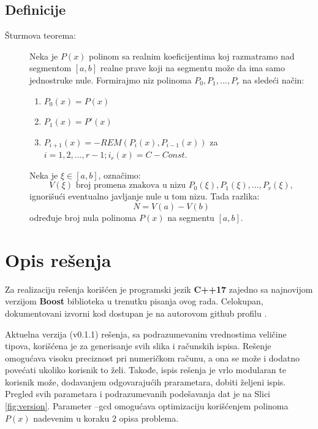 \documentclass[a4paper,10pt]{article}
\begin{document}
\subsection{Definicije}
\label{definitions}
\begin{description}
\item[Šturmova teorema:]
Neka je $P(x)$ polinom sa realnim koeficijentima koj razmatramo nad segmentom $[a,b]$ realne prave koji na segmentu može da ima samo jednostruke nule. Formirajmo niz polinoma $P_0,P_1,...,P_r$ na sledeći način:
\begin{enumerate}
    \item $P_0(x) = P(x)$
    \item $P_1(x) = P'(x)$
    \item $P_{i+1}(x) = -REM(P_i(x),P_{i-1}(x))$ za $i = 1,2,...,r-1; i_r(x) = C - Const.$
\end{enumerate}
Neka je $\xi \in [a,b]$, označimo:
\[V(\xi) \text{ broj promena znakova u nizu } P_0(\xi),P_1(\xi),...,P_r(\xi),\]
ignorišući eventualno javljanje nule u tom nizu. Tada razlika:
\[N = V(a) - V(b)\]
određuje broj nula polinoma $P(x)$ na segmentu $[a,b]$.
\end{description} 
 

\section{Opis rešenja}

Za realizaciju rešenja korišćen je programski jezik \textbf{C++17} zajedno sa najnovijom verzijom \textbf{Boost} biblioteka u trenutku pisanja ovog rada. Celokupan, dokumentovani izvorni kod dostupan je na autorovom github profilu \cite{WEBSITE:Github}.

\vspace{11pt}
Aktuelna verzija (v0.1.1) rešenja, sa podrazumevanim vrednostima veličine tipova, korišćena je za generisanje svih slika i računskih ispisa. Rešenje omogućava visoku preciznost pri numeričkom računu, a ona se može i dodatno povećati ukoliko korisnik to želi. Takođe, ispis rešenja je vrlo modularan te korisnik može, dodavanjem odgovarajućih prarametara, dobiti željeni ispis. Pregled svih parametara i podrazumevanih podešavanja dat je na Slici \ref{fig:version}. Parameter --gcd omogućava optimizaciju korišćenjem polinoma $P(x)$ nadevenim u koraku 2 opisa problema.
\end{document}
